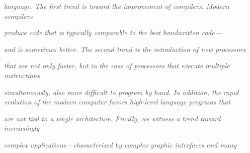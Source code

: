 \documentclass[12pt]{article}
\begin{document}
\begin{adjustwidth}{0.5in}{0.0in}
\textit{\textcolor[HTML]{525252}{language. The first trend is toward the improvement of compilers. Modern compilers}}\par

\end{adjustwidth}

\begin{adjustwidth}{0.5in}{0.0in}
\textit{\textcolor[HTML]{525252}{produce code that is typically comparable to the best handwritten code—}}\par

\end{adjustwidth}

\begin{adjustwidth}{0.5in}{0.0in}
\textit{\textcolor[HTML]{525252}{and is sometimes better. The second trend is the introduction of new processors}}\par

\end{adjustwidth}

\begin{adjustwidth}{0.5in}{0.0in}
\textit{\textcolor[HTML]{525252}{that are not only faster, but in the case of processors that execute multiple instructions}}\par

\end{adjustwidth}

\begin{adjustwidth}{0.5in}{0.0in}
\textit{\textcolor[HTML]{525252}{simultaneously, also more difficult to program by hand. In addition, the rapid evolution of the modern computer favors high-level language programs that}}\par

\end{adjustwidth}

\begin{adjustwidth}{0.5in}{0.0in}
\textit{\textcolor[HTML]{525252}{are not tied to a single architecture. Finally, we witness a trend toward increasingly}}\par

\end{adjustwidth}

\begin{adjustwidth}{0.5in}{0.0in}
\textit{\textcolor[HTML]{525252}{complex applications—characterized by complex graphic interfaces and many}}\par

\end{adjustwidth}
\end{document}
